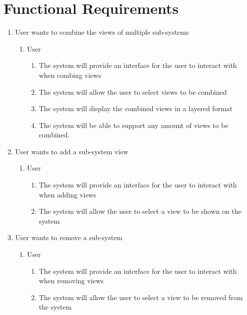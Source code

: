 \documentclass[12pt, titlepage]{article}
\begin{document}
\section{Functional Requirements}
\label{sec:functional_requirements}


\begin{enumerate}[{BE}1.]
	\item User wants to combine the views of multiple sub-systems
	\begin{enumerate}[{VP1}.1]
		\item User
			\begin{enumerate}
				\item The system will provide an interface for the user to interact with when combing views
				\item The system will allow the user to select views to be combined
				\item The system will display the combined views in a layered format
				\item The system will be able to support any amount of views to be combined.
			\end{enumerate}
	\end{enumerate}
	
	\item User wants to add a sub-system view
	\begin{enumerate}[{VP2}.1]
		\item User
			\begin{enumerate}
				\item The system will provide an interface for the user to interact with when adding views
				\item The system will allow the user to select a view to be shown on the system
			\end{enumerate}
	\end{enumerate}
	
	\item User wants to remove a sub-system
	\begin{enumerate}[{VP3}.1]
		\item User
			\begin{enumerate}
				\item The system will provide an interface for the user to interact with when removing views
				\item The system will allow the user to select a view to be removed from the system
			\end{enumerate}
	\end{enumerate}
	

\end{enumerate}
\end{document}
